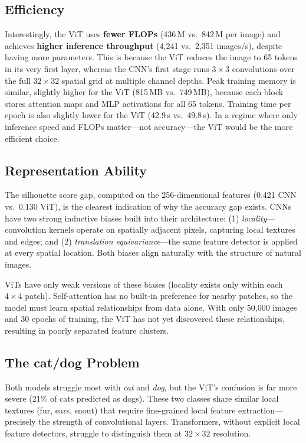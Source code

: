 \documentclass[11pt,a4paper]{article}
\begin{document}
\subsection{Efficiency}

Interestingly, the ViT uses \textbf{fewer FLOPs} (436\,M vs.\ 842\,M per image) and
achieves \textbf{higher inference throughput} (4{,}241 vs.\ 2{,}351 images/s), despite
having more parameters.
This is because the ViT reduces the image to 65 tokens in its very first layer, whereas
the CNN's first stage runs $3\times3$ convolutions over the full $32\times32$ spatial grid
at multiple channel depths.
Peak training memory is similar, slightly higher for the ViT (815\,MB vs.\ 749\,MB),
because each block stores attention maps and MLP activations for all 65 tokens.
Training time per epoch is also slightly lower for the ViT (42.9\,s vs.\ 49.8\,s).
In a regime where only inference speed and FLOPs matter—not accuracy—the ViT would be
the more efficient choice.

\subsection{Representation Ability}

The silhouette score gap, computed on the 256-dimensional features (0.421 CNN vs.\ 0.130 ViT), is the clearest indication
of why the accuracy gap exists.
CNNs have two strong inductive biases built into their architecture:
(1) \emph{locality}—convolution kernels operate on spatially adjacent pixels, capturing
local textures and edges; and
(2) \emph{translation equivariance}—the same feature detector is applied at every
spatial location.
Both biases align naturally with the structure of natural images.

ViTs have only weak versions of these biases (locality exists only within each
$4\times4$ patch).
Self-attention has no built-in preference for nearby patches, so the model must
learn spatial relationships from data alone.
With only 50{,}000 images and 30 epochs of training, the ViT has not yet discovered
these relationships, resulting in poorly separated feature clusters.

\subsection{The cat/dog Problem}

Both models struggle most with \textit{cat} and \textit{dog}, but the ViT's confusion
is far more severe (21\% of cats predicted as dogs).
These two classes share similar local textures (fur, ears, snout) that require
fine-grained local feature extraction—precisely the strength of convolutional layers.
Transformers, without explicit local feature detectors, struggle to distinguish them
at $32\times32$ resolution.
\end{document}
